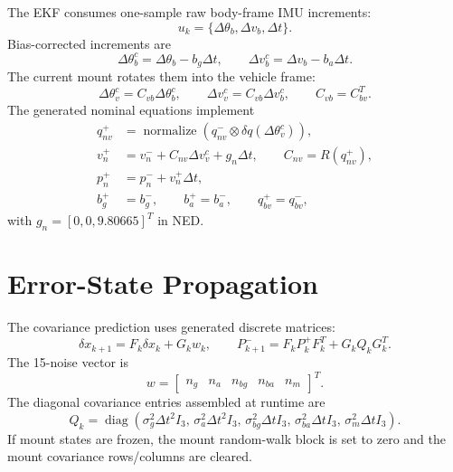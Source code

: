 \documentclass[11pt]{article}
\newcommand{\T}{^{T}}
\newcommand{\dq}{\delta q}
\newcommand{\dt}{\Delta t}
\begin{document}
The EKF consumes one-sample raw body-frame IMU increments:
\begin{equation}
  u_k = \{\Delta\theta_b,\Delta v_b,\dt\}.
\end{equation}
Bias-corrected increments are
\begin{equation}
  \Delta\theta_b^c=\Delta\theta_b-b_g\dt,\qquad
  \Delta v_b^c=\Delta v_b-b_a\dt .
\end{equation}
The current mount rotates them into the vehicle frame:
\begin{equation}
  \Delta\theta_v^c=C_{vb}\Delta\theta_b^c,\qquad
  \Delta v_v^c=C_{vb}\Delta v_b^c,\qquad C_{vb}=C_{bv}\T .
\end{equation}
The generated nominal equations implement
\begin{align}
  q_{nv}^{+} &= \operatorname{normalize}\left(q_{nv}^{-}\otimes
  \dq(\Delta\theta_v^c)\right),\\
  v_n^{+} &= v_n^{-}+C_{nv}\Delta v_v^c+g_n\dt,\qquad
  C_{nv}=R(q_{nv}^{+}),\\
  p_n^{+} &= p_n^{-}+v_n^{+}\dt,\\
  b_g^{+}&=b_g^{-},\qquad b_a^{+}=b_a^{-},\qquad q_{bv}^{+}=q_{bv}^{-},
\end{align}
with \(g_n=[0,0,9.80665]\T\) in NED.

\section{Error-State Propagation}

The covariance prediction uses generated discrete matrices:
\begin{equation}
  \delta x_{k+1}=F_k\delta x_k+G_kw_k,
  \qquad
  P_{k+1}^{-}=F_kP_k^{+}F_k\T+G_kQ_kG_k\T .
\end{equation}
The 15-noise vector is
\begin{equation}
  w=
  \begin{bmatrix}
  n_g & n_a & n_{bg} & n_{ba} & n_m
  \end{bmatrix}\T .
\end{equation}
The diagonal covariance entries assembled at runtime are
\begin{equation}
  Q_k=\operatorname{diag}\left(
  \sigma_g^2\dt^2 I_3,\,
  \sigma_a^2\dt^2 I_3,\,
  \sigma_{bg}^2\dt I_3,\,
  \sigma_{ba}^2\dt I_3,\,
  \sigma_m^2\dt I_3
  \right).
\end{equation}
If mount states are frozen, the mount random-walk block is set to zero
and the mount covariance rows/columns are cleared.
\end{document}
